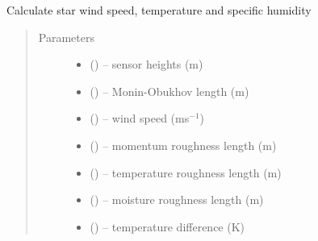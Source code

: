 \documentclass[letterpaper,10pt,english]{sphinxmanual}
\begin{document}

\begin{fulllineitems}
\label{\detokenize{index:flux_subs.get_strs}}
Calculate star wind speed, temperature and specific humidity

\begin{quote}\begin{description}
\item[{Parameters}] \leavevmode
\begin{itemize}
\item {} 
(\href{https://docs.python.org/3/library/functions.html\#float}{}) -- sensor heights (m)

\item {} 
(\href{https://docs.python.org/3/library/functions.html\#float}{}) -- Monin-Obukhov length (m)

\item {} 
(\href{https://docs.python.org/3/library/functions.html\#float}{}) -- wind speed (ms$^{-1}$)

\item {} 
(\href{https://docs.python.org/3/library/functions.html\#float}{}) -- momentum roughness length (m)

\item {} 
(\href{https://docs.python.org/3/library/functions.html\#float}{}) -- temperature roughness length (m)

\item {} 
(\href{https://docs.python.org/3/library/functions.html\#float}{}) -- moisture roughness length (m)

\item {} 
(\href{https://docs.python.org/3/library/functions.html\#float}{}) -- temperature difference (K)


\end{itemize}
\end{description}
\end{quote}
\end{fulllineitems}
\end{document}
